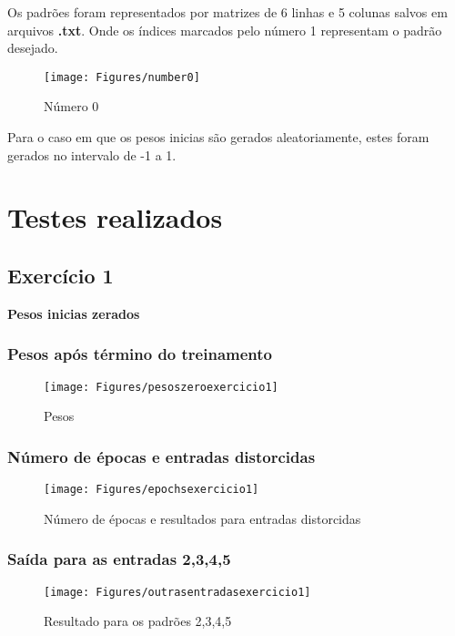 \documentclass[hidelinks,12pt]{article}
\begin{document}
	Os padrões foram representados por matrizes de 6 linhas e 5 colunas salvos em  arquivos \textbf{.txt}. Onde os índices marcados pelo número 1 representam o padrão desejado.
		
	\begin{figure}[h!]
		\centering
		\texttt{[image: Figures/number0]}
		\caption{Número 0}
	\end{figure}
	
	Para o caso em que os pesos inicias são gerados aleatoriamente, estes foram gerados no intervalo de -1 a 1.
\section{Testes realizados}

\subsection{Exercício 1}
	\newpage
	\large {\textbf{Pesos inicias zerados}}
	
	\subsubsection{Pesos após término do treinamento}
		\begin{figure}[h!]
			\centering
			\texttt{[image: Figures/pesoszeroexercicio1]}
			\caption{Pesos}
		\end{figure}
		
	\subsubsection{Número de épocas e entradas distorcidas}

		\begin{figure}[h!]
			\centering
			\texttt{[image: Figures/epochsexercicio1]}
			\caption{Número de épocas e resultados para entradas distorcidas}
		\end{figure}
		
	\newpage
	\subsubsection{Saída para as entradas 2,3,4,5 }

		\begin{figure}[h!]
			\centering
			\texttt{[image: Figures/outrasentradasexercicio1]}
			\caption{Resultado para os padrões 2,3,4,5}
		\end{figure}
	
\end{document}

